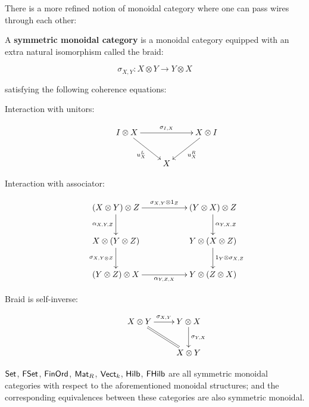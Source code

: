 There is a more refined notion of monoidal category where one can pass wires through each other:

\begin{definition}
A {\bf symmetric monoidal category} is a monoidal category equipped with an extra natural isomorphism called the braid:

$$
\sigma_{X,Y}:X\otimes Y \to Y\otimes X
$$

satisfying the following coherence equations:

\begin{description}
\item[Interaction with unitors:]
$$
\xymatrix{
I \otimes X \ar[rr]^{\sigma_{I,X}} \ar[rd]_{u^L_X} && X \otimes I \ar[ld]^{u^R_X} \\
& X &
}
$$

\item[Interaction with associator:]
$$
\xymatrix{
  (X\otimes Y)\otimes Z \ar[rr]^{\sigma_{X,Y}\otimes 1_Z} \ar[d]_{\alpha_{X,Y,Z}}
    &
    &  (Y\otimes X)\otimes Z \ar[d]^{\alpha_{Y,X,Z}}
  \\X\otimes(Y\otimes Z) \ar[d]_{\sigma_{X,Y\otimes Z}}
    &
    &  Y\otimes(X\otimes Z) \ar[d]^{1_Y\otimes \sigma_{X,Z}}
  \\ (Y\otimes Z)\otimes X \ar[rr]_{\alpha_{Y,Z,X}}
    &
    & Y\otimes (Z\otimes X)
}
$$

\item[Braid is self-inverse:]
$$
\xymatrix{
   X\otimes Y \ar[r]^{\sigma_{X,Y}} \ar@{=}[dr]
   &  Y\otimes X \ar[d]^{\sigma_{Y,X}}\\
   & X \otimes Y
}
$$
\end{description}

\end{definition}


\begin{example}
$\mathsf{Set}$, $\mathsf{FSet}$, $\mathsf{FinOrd}$, $\mathsf{Mat}_R$, $\mathsf{Vect}_k$, $\mathsf{Hilb}$, $\mathsf{FHilb}$ are all symmetric monoidal categories with respect to the aforementioned monoidal structures; and the corresponding equivalences between these categories are also symmetric monoidal.
\end{example}

